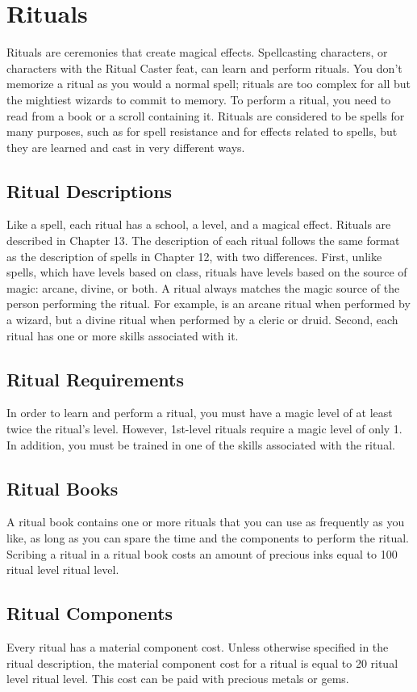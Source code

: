 \section{Rituals}
Rituals are ceremonies that create magical effects. Spellcasting characters, or characters with the Ritual Caster feat, can learn and perform rituals. You don't memorize a ritual as you would a normal spell; rituals are too complex for all but the mightiest wizards to commit to memory. To perform a ritual, you need to read from a book or a scroll containing it. Rituals are considered to be spells for many purposes, such as for spell resistance and for effects related to spells, but they are learned and cast in very different ways.
\subsection{Ritual Descriptions}
\par Like a spell, each ritual has a school, a level, and a magical effect. Rituals are described in Chapter 13. The description of each ritual follows the same format as the description of spells in Chapter 12, with two differences. First, unlike spells, which have levels based on class, rituals have levels based on the source of magic: arcane, divine, or both. A ritual always matches the magic source of the person performing the ritual. For example,  is an arcane ritual when performed by a wizard, but a divine ritual when performed by a cleric or druid. Second, each ritual has one or more skills associated with it.
\subsection{Ritual Requirements} In order to learn and perform a ritual, you must have a magic level of at least twice the ritual's level. However, 1st-level rituals require a magic level of only 1. In addition, you must be trained in one of the skills associated with the ritual.
\subsection{Ritual Books}
A ritual book contains one or more rituals that you can use as frequently as you like, as long as you can spare the time and the components to perform the ritual. Scribing a ritual in a ritual book costs an amount of precious inks equal to 100 \mtimes ritual level \mtimes ritual level.
\subsection{Ritual Components}
Every ritual has a material component cost. Unless otherwise specified in the ritual description, the material component cost for a ritual is equal to 20 \mtimes ritual level \mtimes ritual level. This cost can be paid with precious metals or gems.
